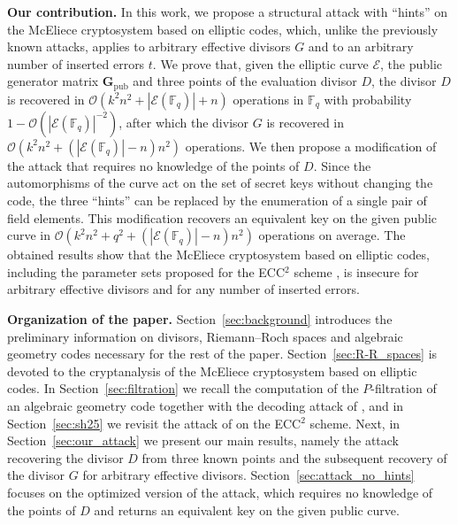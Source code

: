 \documentclass[sn-mathphys-num]{sn-jnl_modified}
\newcommand{\FF}{\ensuremath{\mathbb{F}}}
\begin{document}
\textbf{Our contribution.} In this work, we propose a structural attack with ``hints'' on the McEliece cryptosystem based on elliptic codes, which, unlike the previously known attacks, applies to arbitrary effective divisors $G$ and to an arbitrary number of inserted errors $t$. We prove that, given the elliptic curve $\mathcal{E}$, the public generator matrix $\mathbf{G}_{\operatorname{pub}}$ and three points of the evaluation divisor $D$, the divisor $D$ is recovered in $\mathcal{O}\!\left(k^2n^2 + |\mathcal{E}(\FF_q)| + n\right)$ operations in $\FF_q$ with probability $1 - \mathcal{O}\!\left(|\mathcal{E}(\FF_q)|^{-2}\right)$, after which the divisor $G$ is recovered in $\mathcal{O}\!\left(k^2n^2 + (|\mathcal{E}(\FF_q)|-n)n^2\right)$ operations. We then propose a modification of the attack that requires no knowledge of the points of $D$. Since the automorphisms of the curve act on the set of secret keys without changing the code, the three ``hints'' can be replaced by the enumeration of a single pair of field elements. This modification recovers an equivalent key on the given public curve in $\mathcal{O}\!\left(k^2n^2 + q^2 + (|\mathcal{E}(\FF_q)|-n)n^2\right)$ operations on average.  The obtained results show that the McEliece cryptosystem based on elliptic codes, including the parameter sets proposed for the ECC$^2$ scheme \cite{ECC2}, is insecure for arbitrary effective divisors and for any number of inserted errors.

\textbf{Organization of the paper.} Section~\ref{sec:background} introduces the preliminary information on divisors, Riemann--Roch spaces and algebraic geometry codes necessary for the rest of the paper. Section~\ref{sec:R-R_spaces} is devoted to the cryptanalysis of the McEliece cryptosystem based on elliptic codes. In Section~\ref{sec:filtration} we recall the computation of the $P$-filtration of an algebraic geometry code together with the decoding attack of \cite{CMP17}, and in Section~\ref{sec:sh25} we revisit the attack of \cite{Sh25} on the ECC$^2$ scheme. Next, in Section~\ref{sec:our_attack} we present our main results, namely the attack recovering the divisor $D$ from three known points and the subsequent recovery of the divisor $G$ for arbitrary effective divisors. Section~\ref{sec:attack_no_hints} focuses on the optimized version of the attack, which requires no knowledge of the points of $D$ and returns an equivalent key on the given public curve. 
\end{document}
